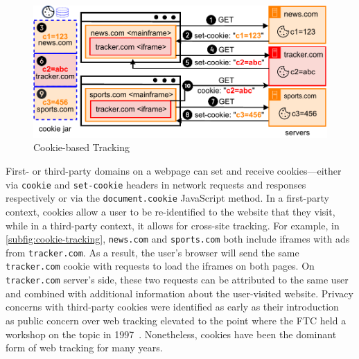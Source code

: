 \begin{figure}[htbp]
    \vspace{-2mm}
    \centering
    \includegraphics[width=1\linewidth]{figures/tracking-mechanisms-cookie.pdf}
    \vspace{-6mm}
    \caption{Cookie-based Tracking}
    \label{subfig:cookie-tracking}
    \vspace{-2mm}
\end{figure}

First- or third-party domains on a webpage can set and receive cookies---either via \texttt{cookie} and \texttt{set-cookie} headers in network requests and responses respectively or via the \texttt{document.cookie} JavaScript method. 
%
In a first-party context, cookies allow a user to be re-identified to the website that they visit, while in a third-party context, it allows for cross-site tracking. 
%
For example, in \autoref{subfig:cookie-tracking}, \texttt{news.com} and \texttt{sports.com} both include iframes with ads from \texttt{tracker.com}. 
%
As a result, the user’s browser will send the same \texttt{tracker.com} cookie with requests to load the iframes on both pages. 
%
On \texttt{tracker.com} server's side, these two requests can be attributed to the same user and combined with additional information about the user-visited website. 
%
Privacy concerns with third-party cookies were identified as early as their introduction~\cite{montulliHTTPStateManagement1997,kristolHTTPCookiesStandards2001} as public concern over web tracking elevated to the point where the FTC held a workshop on the topic in 1997~\cite{ftcWorkshopConsumerInformation1997}. 
Nonetheless, cookies have been the dominant form of web tracking for many years. 

